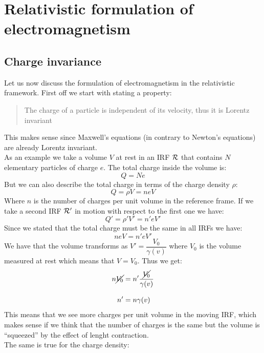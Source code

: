 \chapter{Relativistic formulation of electromagnetism}
\section{Charge invariance}
Let us now discuss the formulation of electromagnetism in the relativistic framework. First off we start with stating a property:
\begin{quotation}
  The charge of a particle is independent of its velocity, thus it is Lorentz invariant
\end{quotation}
This makes sense since Maxwell's equations (in contrary to Newton's equations) are already Lorentz invariant.\\
As an example we take a volume $V$ at rest in an IRF $\mathcal{R}$ that contains $N$ elementary particles of charge $e$. The total charge inside the volume is:
\begin{equation}
  Q = Ne
\end{equation}
But we can also describe the total charge in terms of the charge density $\rho$:
\begin{equation}
  Q = \rho V = n e V
\end{equation}
Where $n$ is the number of charges per unit volume in the reference frame. If we take a second IRF $\mathcal{R}'$ in motion with respect to the first one we have:
\begin{equation}
  Q' = \rho'V' = n'eV'
\end{equation}
Since we stated that the total charge must be the same in all IRFs we have:
\begin{equation}
  n e V = n'eV'
\end{equation}
We have that the volume transforms as $V' = \dfrac{V_0}{\gamma(v)}$ where $V_0$ is the volume measured at rest which means that $V = V_0$. Thus we get:
\begin{equation}
  \begin{split}
    n \cancel{V_0} &= n' \dfrac{\cancel{V_0}}{\gamma(v)} \\[8pt]
    n' &= n\gamma(v)
  \end{split}
\end{equation}
This means that we see more charges per unit volume in the moving IRF, which makes sense if we think that the number of charges is the same but the volume is ``squeezed'' by the effect of lenght contraction.\\ The same is true for the charge density:
